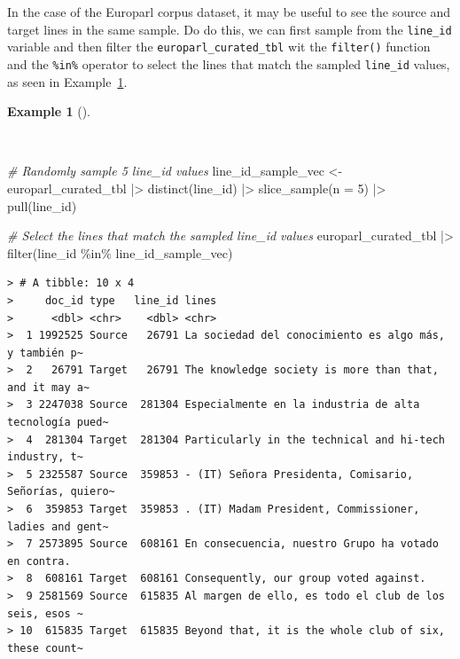 \documentclass[
  letterpaper,
  DIV=11,
  numbers=noendperiod]{scrreport}
\newenvironment{Shaded}{\begin{snugshade}}{\end{snugshade}}
\newcommand{\AttributeTok}[1]{\textcolor[rgb]{0.00,0.00,0.00}{#1}}
\newcommand{\CommentTok}[1]{\textcolor[rgb]{0.00,0.00,0.00}{\textit{#1}}}
\newcommand{\DecValTok}[1]{\textcolor[rgb]{0.00,0.00,0.00}{#1}}
\newcommand{\FunctionTok}[1]{\textcolor[rgb]{0.00,0.00,0.00}{#1}}
\newcommand{\NormalTok}[1]{\textcolor[rgb]{0.00,0.00,0.00}{#1}}
\newcommand{\OtherTok}[1]{\textcolor[rgb]{0.00,0.00,0.00}{#1}}
\newcommand{\SpecialCharTok}[1]{\textcolor[rgb]{0.00,0.00,0.00}{#1}}
\theoremstyle{definition}
\newtheorem{example}{Example}[chapter]
\theoremstyle{remark}
\begin{document}
In the case of the Europarl corpus dataset, it may be useful to see the
source and target lines in the same sample. Do do this, we can first
sample from the \texttt{line\_id} variable and then filter the
\texttt{europarl\_curated\_tbl} wit the \texttt{filter()} function and
the \texttt{\%in\%} operator to select the lines that match the sampled
\texttt{line\_id} values, as seen in
Example~\ref{exm-td-europarl-sample-2}.

\begin{example}[]\protect\hypertarget{exm-td-europarl-sample-2}{}\label{exm-td-europarl-sample-2}

~

\begin{Shaded}
\begin{Highlighting}[]
\CommentTok{\# Randomly sample 5 line\_id values}
\NormalTok{line\_id\_sample\_vec }\OtherTok{\textless{}{-}} 
\NormalTok{  europarl\_curated\_tbl }\SpecialCharTok{|\textgreater{}}
  \FunctionTok{distinct}\NormalTok{(line\_id) }\SpecialCharTok{|\textgreater{}} 
  \FunctionTok{slice\_sample}\NormalTok{(}\AttributeTok{n =} \DecValTok{5}\NormalTok{) }\SpecialCharTok{|\textgreater{}} 
  \FunctionTok{pull}\NormalTok{(line\_id)}

\CommentTok{\# Select the lines that match the sampled line\_id values}
\NormalTok{europarl\_curated\_tbl }\SpecialCharTok{|\textgreater{}}
  \FunctionTok{filter}\NormalTok{(line\_id }\SpecialCharTok{\%in\%}\NormalTok{ line\_id\_sample\_vec)}
\end{Highlighting}
\end{Shaded}

\begin{verbatim}
> # A tibble: 10 x 4
>     doc_id type   line_id lines                                                 
>      <dbl> <chr>    <dbl> <chr>                                                 
>  1 1992525 Source   26791 La sociedad del conocimiento es algo más, y también p~
>  2   26791 Target   26791 The knowledge society is more than that, and it may a~
>  3 2247038 Source  281304 Especialmente en la industria de alta tecnología pued~
>  4  281304 Target  281304 Particularly in the technical and hi-tech industry, t~
>  5 2325587 Source  359853 - (IT) Señora Presidenta, Comisario, Señorías, quiero~
>  6  359853 Target  359853 . (IT) Madam President, Commissioner, ladies and gent~
>  7 2573895 Source  608161 En consecuencia, nuestro Grupo ha votado en contra.   
>  8  608161 Target  608161 Consequently, our group voted against.                
>  9 2581569 Source  615835 Al margen de ello, es todo el club de los seis, esos ~
> 10  615835 Target  615835 Beyond that, it is the whole club of six, these count~
\end{verbatim}

\end{example}
\end{document}
